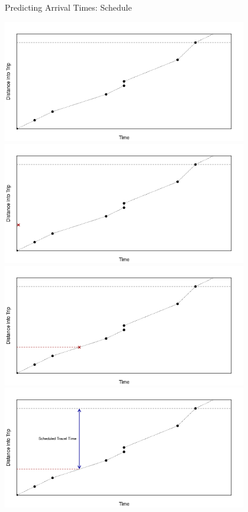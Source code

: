 \documentclass[10pt,t]{beamer}
\begin{document}
\begin{frame}{Predicting Arrival Times: Schedule}
  \begin{overprint}
    \centering
    \includegraphics[width=0.8\textwidth]{figs/pred-sched-frame1.png}
    \centering
    \includegraphics[width=0.8\textwidth]{figs/pred-sched-frame2.png}
    \centering
    \includegraphics[width=0.8\textwidth]{figs/pred-sched-frame3.png}
    \centering
    \includegraphics[width=0.8\textwidth]{figs/pred-sched-frame4.png}
  \end{overprint}

  \onslide<+->
\end{frame}
\end{document}
